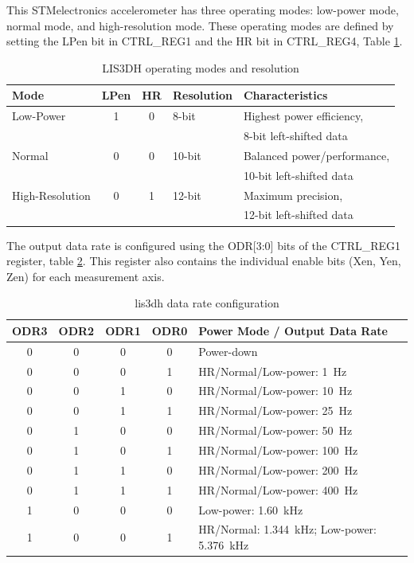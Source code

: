 This STMelectronics accelerometer has three operating modes: low-power mode, 
normal mode, and high-resolution mode. These operating modes are defined by 
setting the LPen bit in CTRL\_REG1 and the HR bit in CTRL\_REG4, Table \ref{tab:lis3dh_modes}. 

\begin{table}[H]
    \centering
    \begin{tabular}{|l|c|c|l|l|}
        \hline
        \textbf{Mode} & \textbf{LPen} & \textbf{HR} & \textbf{Resolution} & \textbf{Characteristics} \\
        \hline
        Low-Power   &   1   & 0 &   8-bit   & Highest power efficiency,\\
                                            &&&&8-bit left-shifted data \\
        \hline
        Normal      &   0   & 0 &   10-bit  & Balanced power/performance,\\
                                            &&&&10-bit left-shifted data \\
        \hline
        High-Resolution & 0 & 1 &   12-bit  & Maximum precision,\\ 
                                            &&&& 12-bit left-shifted data \\
        \hline
    \end{tabular}
    \caption{LIS3DH operating modes and resolution}
    \label{tab:lis3dh_modes}
\end{table}

The output data rate is configured using the ODR[3:0] bits of the CTRL\_REG1 
register, table \ref{tab:lis3dh_odr}. This register also contains the individual enable bits (Xen, Yen, 
Zen) for each measurement axis.

\begin{table}[H]
    \centering
    \begin{tabular}{|cccc|l|}
        \hline
        \textbf{ODR3} & \textbf{ODR2} & \textbf{ODR1} & \textbf{ODR0} & \textbf{Power Mode / Output Data Rate} \\
        \hline
        0 & 0 & 0 & 0 & Power-down \\
        0 & 0 & 0 & 1 & HR/Normal/Low-power: 1~Hz \\
        0 & 0 & 1 & 0 & HR/Normal/Low-power: 10~Hz \\
        0 & 0 & 1 & 1 & HR/Normal/Low-power: 25~Hz \\
        0 & 1 & 0 & 0 & HR/Normal/Low-power: 50~Hz \\
        0 & 1 & 0 & 1 & HR/Normal/Low-power: 100~Hz \\
        0 & 1 & 1 & 0 & HR/Normal/Low-power: 200~Hz \\
        0 & 1 & 1 & 1 & HR/Normal/Low-power: 400~Hz \\
        1 & 0 & 0 & 0 & Low-power: 1.60~kHz \\
        1 & 0 & 0 & 1 & HR/Normal: 1.344~kHz; Low-power: 5.376~kHz \\
        \hline
    \end{tabular}
    \caption{lis3dh data rate configuration}
    \label{tab:lis3dh_odr}
\end{table}

